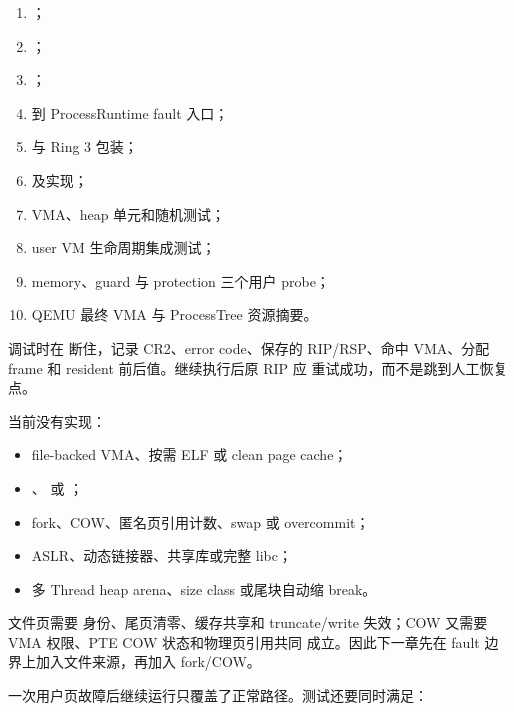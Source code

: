 \par
\begin{enumerate}
  \item {}；
  \item {}；
  \item {}；
  \item {} 到 ProcessRuntime fault 入口；
  \item {} 与 Ring 3 包装；
  \item {} 及实现；
  \item VMA、heap 单元和随机测试；
  \item user VM 生命周期集成测试；
  \item memory、guard 与 protection 三个用户 probe；
  \item QEMU 最终 VMA 与 ProcessTree 资源摘要。
\end{enumerate}

调试时在  断住，记录 CR2、error code、保存的
RIP/RSP、命中 VMA、分配 frame 和 resident 前后值。继续执行后原 RIP 应
重试成功，而不是跳到人工恢复点。

当前没有实现：

\begin{itemize}
  \item file-backed VMA、按需 ELF 或 clean page cache；
  \item {}、 或 ；
  \item fork、COW、匿名页引用计数、swap 或 overcommit；
  \item ASLR、动态链接器、共享库或完整 libc；
  \item 多 Thread heap arena、size class 或尾块自动缩 break。
\end{itemize}

文件页需要  身份、尾页清零、缓存共享和
truncate/write 失效；COW 又需要 VMA 权限、PTE COW 状态和物理页引用共同
成立。因此下一章先在 fault 边界上加入文件来源，再加入 fork/COW。

一次用户页故障后继续运行只覆盖了正常路径。测试还要同时满足：

